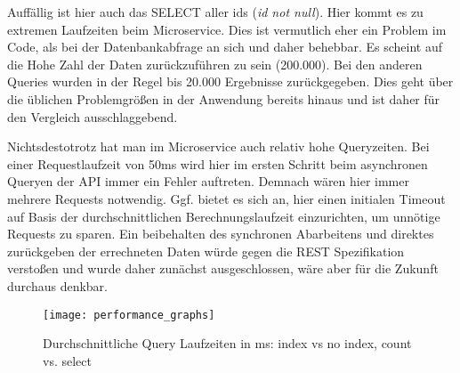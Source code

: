 Auffällig ist hier auch das SELECT aller ids (\textit{id not null}). Hier kommt es zu extremen Laufzeiten beim Microservice. Dies ist vermutlich eher ein Problem im Code, als bei der Datenbankabfrage an sich und daher behebbar. Es scheint auf die Hohe Zahl der Daten zurückzuführen zu sein (200.000). Bei den anderen Queries wurden in der Regel bis 20.000 Ergebnisse zurückgegeben. Dies geht über die üblichen Problemgrößen in der Anwendung bereits hinaus und ist daher für den Vergleich ausschlaggebend.

Nichtsdestotrotz hat man im Microservice auch relativ hohe Queryzeiten. Bei einer Requestlaufzeit von 50ms wird hier im ersten Schritt beim asynchronen Queryen der API immer ein Fehler auftreten. Demnach wären hier immer mehrere Requests notwendig. Ggf. bietet es sich an, hier einen initialen Timeout auf Basis der durchschnittlichen Berechnungslaufzeit einzurichten, um unnötige Requests zu sparen. Ein beibehalten des synchronen Abarbeitens und direktes zurückgeben der errechneten Daten würde gegen die REST Spezifikation verstoßen und wurde daher zunächst ausgeschlossen, wäre aber für die Zukunft durchaus denkbar.

\begin{figure}[!ht]
    \centering
    \caption{Durchschnittliche Query Laufzeiten in ms: index vs no index, count vs. select}
    \label{fig:perftestgraph}
    \texttt{[image: performance\_graphs]}
\end{figure}

